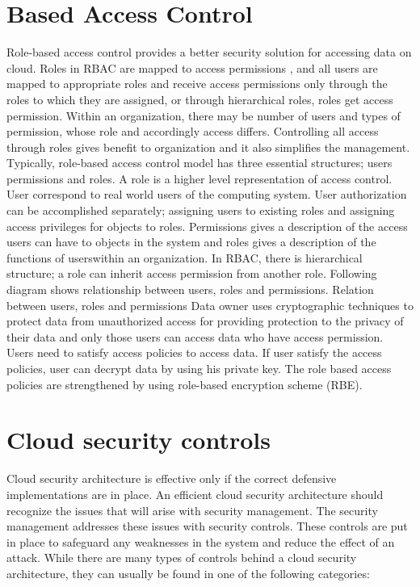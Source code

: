 \documentclass[11pt,a4paper]{report}
\begin{document}
\section{Based Access Control }
Role-based access control provides a better security solution for accessing data on cloud.
Roles in RBAC are mapped to access permissions , and all users are mapped to appropriate roles and receive access permissions only through the roles to which they are assigned, or through hierarchical roles, roles get access permission.
Within an organization, there may be number of users and types of permission, whose role and accordingly access differs. Controlling all access through roles gives benefit to organization and it also simplifies the management. 
Typically, role-based access control model has three essential structures; users permissions and roles.
A role is a higher level representation of access control.
User correspond to real world users of the computing system.
User authorization can be accomplished separately; assigning users to existing roles and assigning access privileges for objects to roles.
Permissions gives a description of the access users can have to objects in the system and roles gives a description of the functions of userswithin an organization.
In RBAC, there is hierarchical structure; a role can inherit access permission from another role.
Following diagram shows relationship between users, roles and permissions.
Relation between users, roles and permissions Data owner uses cryptographic techniques to protect data from unauthorized access for providing protection to the privacy of their data and only those users can access data who have access permission. Users need to satisfy access policies to access data.
If user satisfy the access policies, user can decrypt data by using his private key. The role based access policies are strengthened by using role-based encryption scheme (RBE).
\section{Cloud security controls}
Cloud security architecture is effective only if the correct defensive implementations are in place.
An efficient cloud security architecture should recognize the issues that will arise with security management.
The security management addresses these issues with security controls.
These controls are put in place to safeguard any weaknesses in the system and reduce the effect of an attack.
While there are many types of controls behind a cloud security architecture, they can usually be found in one of the following categories: 
\end{document}
